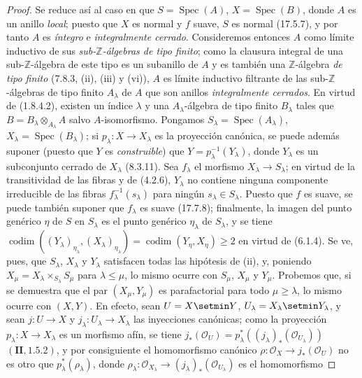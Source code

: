 \begin{proof}
Se reduce así al caso en que $S=\operatorname{Spec}(A)$,
$X=\operatorname{Spec}(B)$, donde $A$ es un anillo \emph{local}; puesto que $X$ es
normal y $f$ suave, $S$ es normal (17.5.7), y por tanto $A$ es \emph{íntegro} e
\emph{integralmente cerrado}. Consideremos entonces $A$ como límite inductivo de sus
\emph{sub-$\mathbb Z$-álgebras de tipo finito}; como la clausura integral de una
sub-$\mathbb Z$-álgebra de este tipo es un subanillo de $A$ y es también una
$\mathbb Z$-álgebra \emph{de tipo finito} (7.8.3, (ii), (iii) y (vi)), $A$ es límite inductivo
filtrante de las sub-$\mathbb Z$-álgebras de tipo finito $A_\lambda$ de $A$ que son
anillos \emph{integralmente cerrados}. En virtud de (1.8.4.2), existen un índice
$\lambda$ y una $A_\lambda$-álgebra de tipo finito $B_\lambda$ tales que
$B=B_\lambda\otimes_{A_\lambda}A$
salvo $A$-isomorfismo. Pongamos $S_\lambda=\operatorname{Spec}(A_\lambda)$,
$X_\lambda=\operatorname{Spec}(B_\lambda)$; si $p_\lambda:X\to X_\lambda$ es la
proyección canónica, se puede además suponer (puesto que $Y$ es
\emph{construible}) que $Y=p_\lambda^{-1}(Y_\lambda)$, donde $Y_\lambda$ es un
subconjunto cerrado de $X_\lambda$ (8.3.11). Sea $f_\lambda$ el morfismo
$X_\lambda\to S_\lambda$; en virtud de la transitividad de las fibras y de (4.2.6),
$Y_\lambda$ no contiene ninguna componente irreducible de las fibras
$f_\lambda^{-1}(s_\lambda)$ para ningún $s_\lambda\in S_\lambda$. Puesto que $f$ es
suave, se puede también suponer que $f_\lambda$ es suave (17.7.8); finalmente, la imagen del
punto genérico $\eta$ de $S$ en $S_\lambda$ es el punto genérico $\eta_\lambda$
de $S_\lambda$, y se tiene
$\operatorname{codim}((Y_\lambda)_{\eta_\lambda},(X_\lambda)_{\eta_\lambda})=\operatorname{codim}(Y_\eta,X_\eta)\geq2$
en virtud de (6.1.4). Se ve, pues, que $S_\lambda$, $X_\lambda$ y $Y_\lambda$
satisfacen todas las hipótesis de (ii), y, poniendo
$X_\mu=X_\lambda\times_{S_\lambda}S_\mu$ para $\lambda\leq\mu$, lo mismo ocurre con
$S_\mu$, $X_\mu$ y $Y_\mu$. Probemos que, si se demuestra que el par
$(X_\mu,Y_\mu)$ es parafactorial para todo $\mu\geq\lambda$, lo mismo ocurre con
$(X,Y)$. En efecto, sean $U=X\setmin Y$, $U_\lambda=X_\lambda\setmin Y_\lambda$, y sean $j:U\to X$ y
$j_\lambda:U_\lambda\to X_\lambda$ las inyecciones canónicas; como la proyección
$p_\lambda:X\to X_\lambda$ es un morfismo afín, se tiene
$j_*(\mathcal O_U)=p_\lambda^*((j_\lambda)_*(\mathcal O_{U_\lambda}))$ $(\mathbf{II}, 1.5.2)$,
y por consiguiente el homomorfismo canónico
$\rho:\mathcal O_X\to j_*(\mathcal O_U)$ no es otro que $p_\lambda^*(\rho_\lambda)$, donde
$\rho_\lambda:\mathcal O_{X_\lambda}\to(j_\lambda)_*(\mathcal O_{U_\lambda})$ es el homomorfismo

\end{proof}
